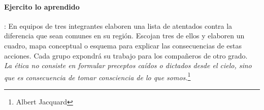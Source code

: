 \documentclass[10pt,twoside]{article}
\begin{document}
\paragraph*{Ejercito lo aprendido}: En equipos de tres integrantes elaboren una lista de atentados contra la diferencia que sean comunes en su región. Escojan tres
de ellos y elaboren un cuadro, mapa conceptual o esquema para explicar las consecuencias de estas acciones. Cada grupo expondrá su trabajo para los compañeros de otro grado.\\

\textit{La ética no consiste en formular preceptos caídos o dictados desde el cielo, sino que es consecuencia de tomar consciencia de lo que somos.}\footnote{Albert Jacquard}
\end{document}
